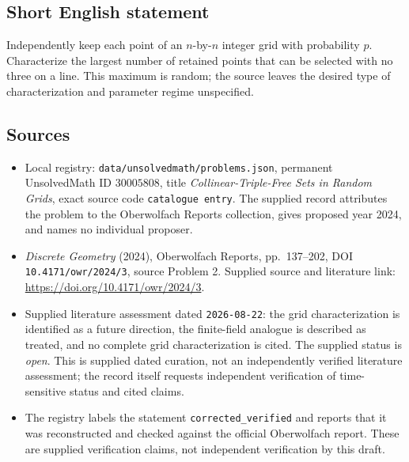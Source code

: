 \documentclass[11pt]{article}
\begin{document}
\subsection{Short English statement}
Independently keep each point of an \(n\)-by-\(n\) integer grid with probability \(p\). Characterize the largest number of retained points that can be selected with no three on a line. This maximum is random; the source leaves the desired type of characterization and parameter regime unspecified.
\subsection{Sources}
\begin{itemize}
\item Local registry: \texttt{data/unsolvedmath/problems.json}, permanent UnsolvedMath ID \(30005808\), title \emph{Collinear-Triple-Free Sets in Random Grids}, exact source code \texttt{catalogue entry}. The supplied record attributes the problem to the Oberwolfach Reports collection, gives proposed year 2024, and names no individual proposer.
\item \emph{Discrete Geometry} (2024), Oberwolfach Reports, pp.~137--202, DOI \texttt{10.4171/owr/2024/3}, source Problem 2. Supplied source and literature link: \url{https://doi.org/10.4171/owr/2024/3}.
\item Supplied literature assessment dated \texttt{2026-08-22}: the grid characterization is identified as a future direction, the finite-field analogue is described as treated, and no complete grid characterization is cited. The supplied status is \emph{open}. This is supplied dated curation, not an independently verified literature assessment; the record itself requests independent verification of time-sensitive status and cited claims.
\item The registry labels the statement \texttt{corrected\_verified} and reports that it was reconstructed and checked against the official Oberwolfach report. These are supplied verification claims, not independent verification by this draft.
\end{itemize}
\end{document}

